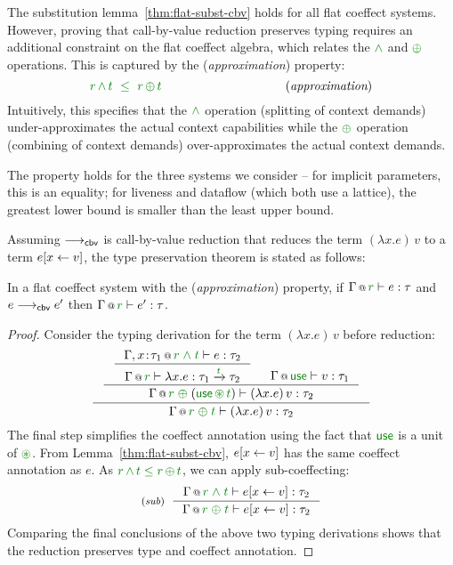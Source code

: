 \noindent
The substitution lemma~\ref{thm:flat-subst-cbv} holds for all flat coeffect systems. However,
proving that call-by-value reduction preserves typing requires an additional constraint on the
flat coeffect algebra, which relates the $\czip$ and $\cpar$ operations. This is captured
by the (\emph{approximation}) property:
%
\begin{equation*}
\cclrd{r}\,\czip\,\cclrd{t}~\;\cleq~\;\cclrd{r}\,\cpar\,\cclrd{t}
\hspace{10em}(\textit{approximation})
\end{equation*}
%
Intuitively, this specifies that the $\czip$ operation (splitting of context demands)
under-approximates the actual context capabilities while the $\cpar$ operation (combining of
context demands) over-approximates the actual context demands.

The property holds for the three systems we consider -- for implicit parameters, this is
an equality; for liveness and dataflow (which both use a lattice), the greatest lower bound
is smaller than the least upper bound.

Assuming $\longrightarrow_{\textnormal{\sffamily cbv}}$ is call-by-value reduction that reduces the term
$(\lambda x.e)\,v$ to a term $e[x \leftarrow v]$, the type preservation theorem is
stated as follows:

\begin{theorem}
\label{thm:cbv-reduction}
In a flat coeffect system with the (\emph{approxi\-mation}) property,
if $\coctx{\Gamma}{\cclrd{r}} \vdash e : \tau$
and $e \longrightarrow_{\textnormal{\sffamily cbv}} e'$ then $\coctx{\Gamma}{\cclrd{r}} \vdash e' : \tau$.
\end{theorem}
\begin{proof}
Consider the typing derivation for the term $(\lambda x.e)\,v$ before reduction:
\begin{equation*}
\inference
  { \inference
  { \inference
      {\coctx{\Gamma, x\!:\!\tau_1}{\cclrd{r}\;\czip\;\cclrd{t}} \vdash e : \tau_2}
      {\coctx{\Gamma}{\cclrd{r}} \vdash \lambda x.e : \tau_1 \xrightarrow{\cclrd{t}} \tau_2 } &
   \coctx{\Gamma}{\cunit} \vdash v : \tau_1 }
  {\coctx{\Gamma}{\cclrd{r} \;\cpar\; (\cunit \,\cseq\, \cclrd{t})} \vdash (\lambda x.e)\,v : \tau_2} }
  {\coctx{\Gamma}{\cclrd{r} \;\cpar\; \cclrd{t}} \vdash (\lambda x.e)\,v : \tau_2}
\end{equation*}
The final step simplifies the coeffect annotation using the fact that $\cunit$ is a unit of $\cseq$.
From Lemma~\ref{thm:flat-subst-cbv}, $e[x \leftarrow v]$ has the same coeffect annotation as $e$.
As $\cclrd{r}\,\czip\,\cclrd{t}\;\cleq\;\cclrd{r}\,\cpar\,\cclrd{t}$, we can apply sub-coeffecting:
%
\begin{equation*}
\tyrule{sub}
 { \coctx{\Gamma}{\cclrd{r}\;\czip\;\cclrd{t}} \vdash \subst{e}{x}{v} : \tau_2 }
 { \coctx{\Gamma}{\cclrd{r}\;\cpar\;\cclrd{t}} \vdash \subst{e}{x}{v} : \tau_2 }
\end{equation*}
%
Comparing the final conclusions of the above two typing derivations shows that
the reduction preserves type and coeffect annotation.
\end{proof}

